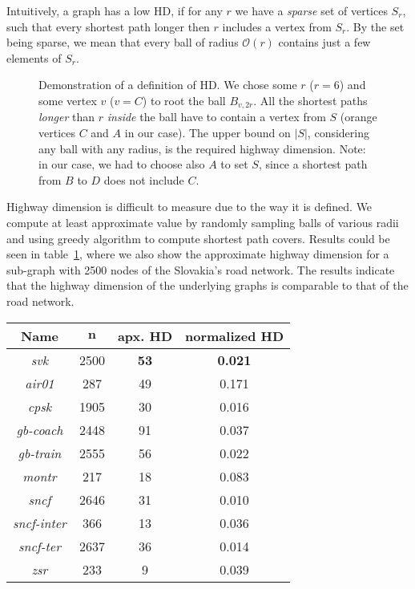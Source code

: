 	\noindent Intuitively, a graph has a low HD, if for any $r$ we have a \emph{sparse} set of vertices $S_{r}$, such that every shortest path longer then $r$ includes a vertex from $S_{r}$. By the set being sparse, we mean that every ball of radius $\mathcal{O}(r)$ contains just a few elements of $S_{r}$.

	\begin{figure}[h!]
    	\begin{center}
		\end{center}
        \caption{\label{fig:highdemonstr} Demonstration of a definition of HD. We chose some $r$ ($r = 6$) and some vertex $v$ ($v = C$) to root the ball $B_{v, 2r}$. All the shortest paths \emph{longer} than $r$ \emph{inside} the ball have to contain a vertex from $S$ (orange vertices $C$ and $A$ in our case). The upper bound on $|S|$, considering any ball with any radius, is the required highway dimension. Note: in our case, we had to choose also $A$ to set $S$, since a shortest path from $B$ to $D$ does not include $C$.}
	\end{figure}
	
	\noindent Highway dimension is difficult to measure due to the way it is defined. We compute at least approximate value by randomly sampling balls of various radii and using greedy algorithm to compute shortest path covers. Results could be seen in table~\ref{table:ug_hd}, where we also show the approximate highway dimension for a sub-graph with 2500 nodes of the Slovakia's road network. The results indicate that the highway dimension of the underlying graphs is comparable to that of the road network.
	
	\begin{table}[H]
		\centering
		\begin{tabular}{c|c|c|c}
			\rowcolor{tablehead}
			\textbf{Name} & $\bm{n}$ & \textbf{apx. $\bm{HD}$} & \textbf{normalized $\bm{HD}$} \\
			\hline
			\textit{svk} & 2500 & \textbf{53} & \textbf{0.021} \\
			\textit{air01} & 287 & 49 & 0.171 \\
			\textit{cpsk} & 1905 & 30 & 0.016 \\
			\textit{gb-coach} & 2448 & 91 & 0.037 \\
			\textit{gb-train} & 2555 & 56 & 0.022 \\
			\textit{montr} & 217 & 18 & 0.083 \\
			\textit{sncf} & 2646 & 31 & 0.010 \\
			\textit{sncf-inter} & 366 & 13 & 0.036 \\
			\textit{sncf-ter} & 2637 & 36 & 0.014 \\
			\textit{zsr} & 233 & 9 & 0.039 \\
		\end{tabular}
		\label{table:ug_hd}
	\end{table}
	
